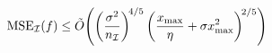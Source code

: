 \documentclass[preview]{standalone}
\begin{document}
\begin{align*}
\special{dvisvgm:raw <g id='unique000'>}\mathrm{MSE}_\mathcal{I}(f)\le\tilde{O}\!\left(\left(\frac{\sigma^2}{n_\mathcal{I}}\right)^{\!4/5}\left(\frac{x_{\max}}{\eta}+\sigma x_{\max}^2\right)^{\!2/5}\right)\special{dvisvgm:raw </g>}
\end{align*}
\end{document}
